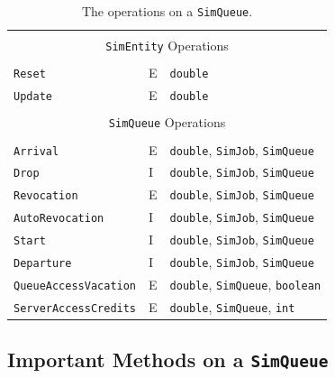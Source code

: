 \documentclass[12pt]{book}
\begin{document}
\begin{table}[h]
\label{tab:guided:operations}
\caption{The operations on a \texttt{SimQueue}.}
\begin{center}
\begin{tabular}{|l|l|l|}
\hline
\multicolumn{3}{|c|}{} \\
\multicolumn{3}{|c|}{\texttt{SimEntity} Operations} \\
\multicolumn{3}{|c|}{} \\
\hline
\lstinline|Reset|   & E & \lstinline|double|                                \\ \hline
\lstinline|Update|  & E & \lstinline|double|                                \\ \hline
\hline
\multicolumn{3}{|c|}{} \\
\multicolumn{3}{|c|}{\texttt{SimQueue} Operations} \\
\multicolumn{3}{|c|}{} \\
\hline
\lstinline|Arrival|           & E & \lstinline|double|, \lstinline|SimJob|, \lstinline|SimQueue| \\ \hline
\lstinline|Drop|              & I & \lstinline|double|, \lstinline|SimJob|, \lstinline|SimQueue| \\ \hline
\lstinline|Revocation|        & E & \lstinline|double|, \lstinline|SimJob|, \lstinline|SimQueue| \\ \hline
\lstinline|AutoRevocation|    & I & \lstinline|double|, \lstinline|SimJob|, \lstinline|SimQueue| \\ \hline
\lstinline|Start|             & I & \lstinline|double|, \lstinline|SimJob|, \lstinline|SimQueue| \\ \hline
\lstinline|Departure|         & I & \lstinline|double|, \lstinline|SimJob|, \lstinline|SimQueue| \\ \hline
\hline
\lstinline|QueueAccessVacation| & E & \lstinline|double|, \lstinline|SimQueue|, \lstinline|boolean| \\ \hline
\lstinline|ServerAccessCredits| & E & \lstinline|double|, \lstinline|SimQueue|, \lstinline|int|     \\ \hline
\end{tabular}
\end{center}
\end{table}

\subsection{Important Methods on a \texttt{SimQueue}}
\end{document}
